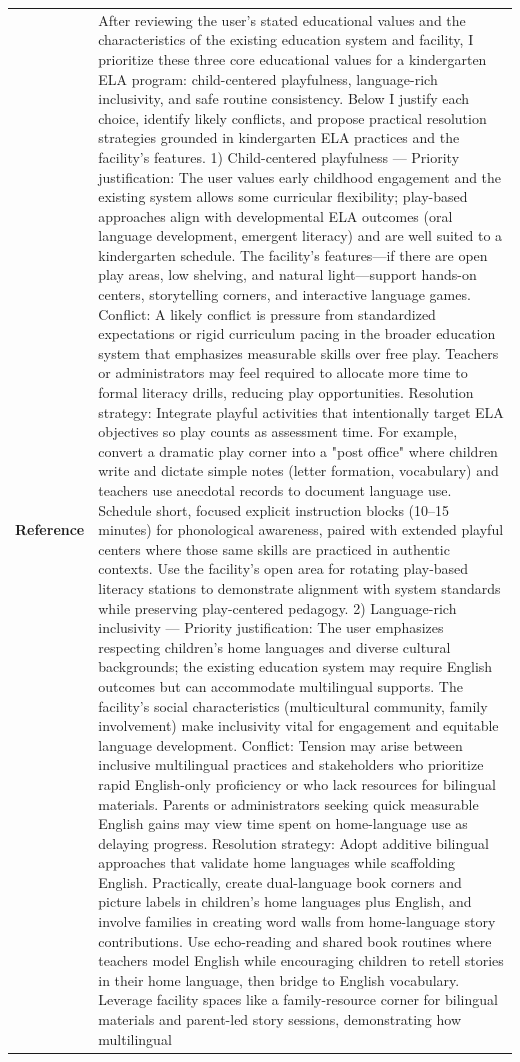 \begin{longtable}{@{}l p{12.5cm}@{}}
  \textbf{Reference} & After reviewing the user's stated educational values and the characteristics of the existing education system and facility, I prioritize these three core educational values for a kindergarten ELA program: child-centered playfulness, language-rich inclusivity, and safe routine consistency. Below I justify each choice, identify likely conflicts, and propose practical resolution strategies grounded in kindergarten ELA practices and the facility's features. 1) Child-centered playfulness --- Priority justification: The user values early childhood engagement and the existing system allows some curricular flexibility; play-based approaches align with developmental ELA outcomes (oral language development, emergent literacy) and are well suited to a kindergarten schedule. The facility's features---if there are open play areas, low shelving, and natural light---support hands-on centers, storytelling corners, and interactive language games. Conflict: A likely conflict is pressure from standardized expectations or rigid curriculum pacing in the broader education system that emphasizes measurable skills over free play. Teachers or administrators may feel required to allocate more time to formal literacy drills, reducing play opportunities. Resolution strategy: Integrate playful activities that intentionally target ELA objectives so play counts as assessment time. For example, convert a dramatic play corner into a "post office" where children write and dictate simple notes (letter formation, vocabulary) and teachers use anecdotal records to document language use. Schedule short, focused explicit instruction blocks (10--15 minutes) for phonological awareness, paired with extended playful centers where those same skills are practiced in authentic contexts. Use the facility's open area for rotating play-based literacy stations to demonstrate alignment with system standards while preserving play-centered pedagogy. 2) Language-rich inclusivity --- Priority justification: The user emphasizes respecting children's home languages and diverse cultural backgrounds; the existing education system may require English outcomes but can accommodate multilingual supports. The facility's social characteristics (multicultural community, family involvement) make inclusivity vital for engagement and equitable language development. Conflict: Tension may arise between inclusive multilingual practices and stakeholders who prioritize rapid English-only proficiency or who lack resources for bilingual materials. Parents or administrators seeking quick measurable English gains may view time spent on home-language use as delaying progress. Resolution strategy: Adopt additive bilingual approaches that validate home languages while scaffolding English. Practically, create dual-language book corners and picture labels in children's home languages plus English, and involve families in creating word walls from home-language story contributions. Use echo-reading and shared book routines where teachers model English while encouraging children to retell stories in their home language, then bridge to English vocabulary. Leverage facility spaces like a family-resource corner for bilingual materials and parent-led story sessions, demonstrating how multilingual 
\end{longtable}
